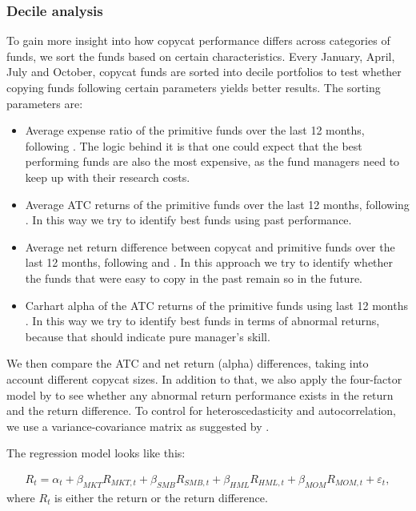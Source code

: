 \documentclass[12pt, a4]{article}
\begin{document}
\subsubsection{Decile analysis}

To gain more insight into how copycat performance differs across categories of funds, we sort the funds based on certain characteristics. Every January, April, July and October, copycat funds are sorted into decile portfolios to test whether copying funds following certain parameters yields better results. The sorting parameters are:

\begin{itemize}
	\item Average expense ratio of the primitive funds over the last 12 months, following \cite{frank}. The logic behind it is that one could expect that the best performing funds are also the most expensive, as the fund managers need to keep up with their research costs.
	\item Average \textsc{ATC} returns of the primitive funds over the last 12 months, following \cite{verbeek}. In this way we try to identify best funds using past performance.
	\item Average net return difference between copycat and primitive funds over the last 12 months, following \cite{verbeek} and \cite{kacperczyk}. In this approach we try to identify whether the funds that were easy to copy in the past remain so in the future.
	\item Carhart alpha of the \textsc{ATC} returns of the primitive funds using last 12 months \citep{carhart}. In this way we try to identify best funds in terms of abnormal returns, because that should indicate pure manager's skill.
\end{itemize}

We then compare the \textsc{ATC} and net return (alpha) differences, taking into account different copycat sizes. In addition to that, we also apply the four-factor model by \cite{carhart} to see whether any abnormal return performance exists in the return and the return difference. To control for heteroscedasticity and autocorrelation, we use a variance-covariance matrix as suggested by \cite{newey}.

The regression model looks like this:

\begin{align}
    R_t = \alpha_t + \beta_{MKT}R_{MKT, t} + \beta_{SMB}R_{SMB, t} + \beta_{HML}R_{HML, t} + \beta_{MOM}R_{MOM, t} + \varepsilon_t,
\end{align}
where $R_t$ is either the return or the return difference.
\end{document}
